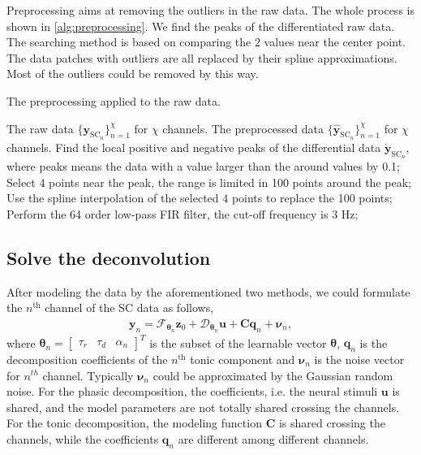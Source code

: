 \documentclass[10pt,conference]{ieeeconf}
\begin{document}
Preprocessing aims at removing the outliers in the raw data. The whole process is shown in \cref{alg:preprocessing}. We find the peaks of the differentiated raw data. The searching method is based on comparing the 2 values near the center point. The data patches with outliers are all replaced by their spline approximations. Most of the outliers could be removed by this way.
\begin{algorithm}[tb]
  \caption{The preprocessing applied to the raw data.}
  \label{alg:preprocessing}
  \begin{algorithmic}[1]
    \REQUIRE The raw data $\{\mathbf{y}_{\mathrm{SC}_n}\}_{n=1}^\chi$ for $\chi$ channels.
    \ENSURE The preprocessed data $\{\hat{\mathbf{y}}_{\mathrm{SC}_n}\}_{n=1}^\chi$ for $\chi$ channels.
    \STATE Find the local positive and negative peaks of the differential data $\dot{\mathbf{y}}_{\mathrm{SC}_n}$, where peaks means the data with a value larger than the around values by 0.1;
    \STATE Select 4 points near the peak, the range is limited in 100 points around the peak;
    \STATE Use the spline interpolation of the selected 4 points to replace the 100 points;
    \ENDFOR
    \STATE Perform the 64 order low-pass FIR filter, the cut-off frequency is 3 Hz;
    \ENDFOR
  \end{algorithmic}
\end{algorithm}

\subsection{Solve the deconvolution}

After modeling the data by the aforementioned two methods, we could formulate the $n^{\mathrm{th}}$ channel of the SC data as follows,
\begin{align}
\mathbf{y}_n = \mathcal{F}_{\boldsymbol{\theta}_n} \mathbf{z}_{0} + \mathcal{D}_{\boldsymbol{\theta}_n} \mathbf{u} + \mathbf{C} \mathbf{q}_n + \boldsymbol{\nu}_n,
\end{align}
where $\boldsymbol{\theta}_n = \begin{bmatrix}
\tau_r & \tau_d & \alpha_n
\end{bmatrix}^T$ is the subset of the learnable vector $\boldsymbol{\theta}$, $\mathbf{q}_n$ is the decomposition coefficients of the $n^{\mathrm{th}}$ tonic component and $\boldsymbol{\nu}_n$ is the noise vector for $n^{th}$ channel. Typically $\boldsymbol{\nu}_n$ could be approximated by the Gaussian random noise. For the phasic decomposition, the coefficients, i.e. the neural stimuli $\mathbf{u}$ is shared, and the model parameters are not totally shared crossing the channels. For the tonic decomposition, the modeling function $\mathbf{C}$ is shared crossing the channels, while the coefficients $\mathbf{q}_n$ are different among different channels.
\end{document}
